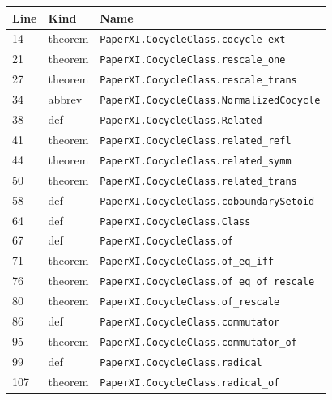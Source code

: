 \documentclass[10pt,oneside]{book}
\begin{document}
\begin{longtable}{@{}p{}p{}p{}@{}}\toprule Line&Kind&Name\\\midrule\endhead

14&theorem&\nolinkurl{PaperXI.CocycleClass.cocycle_ext}\\

21&theorem&\nolinkurl{PaperXI.CocycleClass.rescale_one}\\

27&theorem&\nolinkurl{PaperXI.CocycleClass.rescale_trans}\\

34&abbrev&\nolinkurl{PaperXI.CocycleClass.NormalizedCocycle}\\

38&def&\nolinkurl{PaperXI.CocycleClass.Related}\\

41&theorem&\nolinkurl{PaperXI.CocycleClass.related_refl}\\

44&theorem&\nolinkurl{PaperXI.CocycleClass.related_symm}\\

50&theorem&\nolinkurl{PaperXI.CocycleClass.related_trans}\\

58&def&\nolinkurl{PaperXI.CocycleClass.coboundarySetoid}\\

64&def&\nolinkurl{PaperXI.CocycleClass.Class}\\

67&def&\nolinkurl{PaperXI.CocycleClass.of}\\

71&theorem&\nolinkurl{PaperXI.CocycleClass.of_eq_iff}\\

76&theorem&\nolinkurl{PaperXI.CocycleClass.of_eq_of_rescale}\\

80&theorem&\nolinkurl{PaperXI.CocycleClass.of_rescale}\\

86&def&\nolinkurl{PaperXI.CocycleClass.commutator}\\

95&theorem&\nolinkurl{PaperXI.CocycleClass.commutator_of}\\

99&def&\nolinkurl{PaperXI.CocycleClass.radical}\\

107&theorem&\nolinkurl{PaperXI.CocycleClass.radical_of}\\


\end{longtable}
\end{document}
